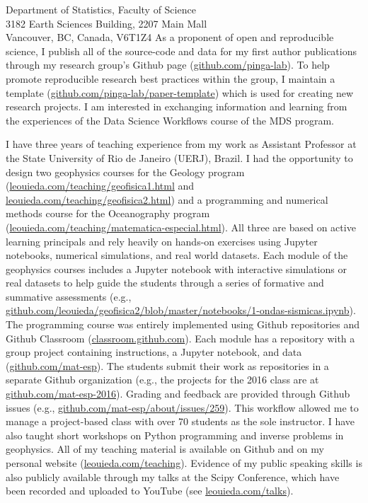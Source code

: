 \documentclass[11pt]{letter}
\begin{document}
\begin{letter}{
    Department of Statistics, Faculty of Science
    \\
    3182 Earth Sciences Building, 2207 Main Mall
    \\
    Vancouver, BC, Canada, V6T1Z4
}
As a proponent of open and reproducible science, I publish all of the
source-code and data for my first author publications through my research
group's Github page
(\href{https://github.com/pinga-lab}{github.com/pinga-lab}).
To help promote reproducible research best practices within the group,
I maintain a template
(\href{https://github.com/pinga-lab/paper-template}{github.com/pinga-lab/paper-template})
which is used for creating new research projects.
I am interested in exchanging information and learning from the experiences of
the Data Science Workflows course of the MDS program.


I have three years of teaching experience from my work as Assistant Professor
at the State University of Rio de Janeiro (UERJ), Brazil.
I had the opportunity to design two geophysics courses for the Geology
program
(\href{http://www.leouieda.com/teaching/geofisica1.html}{leouieda.com/teaching/geofisica1.html}
and
\href{http://www.leouieda.com/teaching/geofisica2.html}{leouieda.com/teaching/geofisica2.html})
and a programming and numerical methods course for the Oceanography
program
(\href{http://www.leouieda.com/teaching/matematica-especial.html}{leouieda.com/teaching/matematica-especial.html}).
All three are based on active learning principals and rely heavily on hands-on
exercises using Jupyter notebooks, numerical simulations, and real world
datasets.
Each module of the geophysics courses includes a Jupyter notebook with
interactive simulations or real datasets to help guide the students through a
series of formative and summative assessments
(e.g.,
\href{https://github.com/leouieda/geofisica2/blob/master/notebooks/1-ondas-sismicas.ipynb}{github.com/leouieda/geofisica2/blob/master/notebooks/1-ondas-sismicas.ipynb}).
The programming course was entirely implemented using Github repositories and
Github Classroom (\href{https://classroom.github.com/}{classroom.github.com}).
Each module has a repository with a group project containing instructions, a
Jupyter notebook, and data
(\href{https://github.com/mat-esp}{github.com/mat-esp}).
The students submit their work as repositories in a separate Github
organization
(e.g., the projects for the
2016 class are at
\href{https://github.com/mat-esp-2016}{github.com/mat-esp-2016}).
Grading and feedback are provided through Github issues (e.g.,
\href{https://github.com/mat-esp/about/issues/259}{github.com/mat-esp/about/issues/259}).
This workflow allowed me to manage a project-based class with over 70 students
as the sole instructor.
I have also taught short workshops on Python programming and inverse problems
in geophysics.
All of my teaching material is available on Github and on my personal website
(\href{http://www.leouieda.com/teaching/}{leouieda.com/teaching}).
Evidence of my public speaking skills is also publicly available through my
talks at the Scipy Conference, which have been recorded and uploaded to YouTube
(see \href{http://www.leouieda.com/talks/}{leouieda.com/talks}).



\end{letter}
\end{document}
